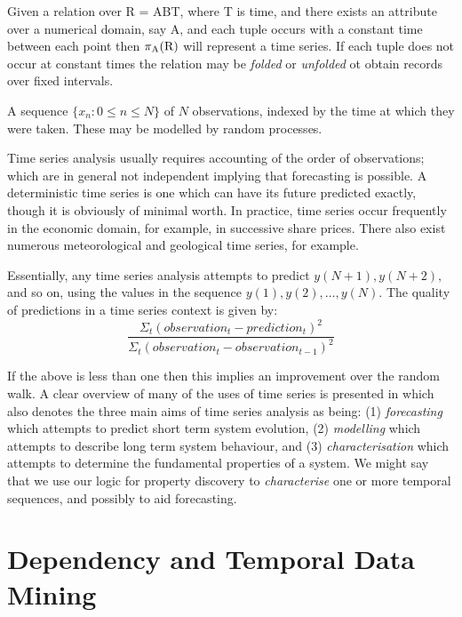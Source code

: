 \smallskip
Given a relation over R = ABT, where T is time, and there exists an
attribute over a numerical domain, say A, and each tuple occurs with a
constant time between each point then $\pi_{\rm A}({\rm R})$ will
represent a time 
series. If each tuple does not occur at constant times the relation
may be {\em folded} or {\em unfolded} ot obtain records over fixed intervals.

\begin{definition}
\begin{rm}
A sequence $\{ x_n : 0 \le n \le N \}$ of $N$ observations, indexed by
the time at which they 
were taken. These may be modelled by random processes.
\end{rm}
\end{definition}

Time series analysis usually requires accounting of the order of
observations; which are in general not independent implying that
forecasting is possible.  A deterministic time series is one which can
have its future predicted exactly, though it is obviously of minimal
worth.  In practice, time series occur frequently in the economic
domain, for example, in successive share prices. There also exist
numerous meteorological and geological time series, for example.

Essentially, any time series analysis attempts to predict $y(N + 1),
y(N + 2),$ and  
so on, using the values in the sequence $y(1), y(2), \ldots, y(N)$.   
The quality of predictions in a time series context is given by:
\begin{displaymath}
\frac{\Sigma_t (observation_t - prediction_t)^2}
{\Sigma_t (observation_t - observation_{t-1})^2}
\end{displaymath}

If the above is less than one then this implies an improvement over
the random walk.  A clear overview of many of the uses of time series
is presented in \cite{wg94} which
also denotes the three main aims of time series analysis as being:
 (1) {\em forecasting } which attempts to predict short term system
evolution, (2) {\em modelling} which attempts to describe long term
system behaviour, and (3) {\em characterisation} which attempts to
determine the fundamental properties of a system. We might say that we
use our logic for property discovery to {\em characterise} one or more temporal
sequences, and possibly to aid forecasting. 


\section{Dependency and Temporal Data Mining}\label{sec:datmin}


